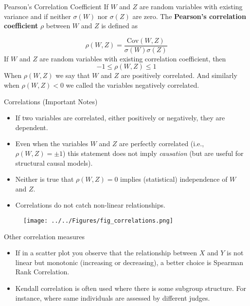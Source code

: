 \documentclass{beamer}
\begin{document}
\begin{frame}{Pearson's Correlation Coefficient}
If $W$ and $Z$ are random variables with existing variance and if neither $\sigma(W)$ nor $\sigma(Z)$ are zero. The {\bf Pearson's correlation coefficient} $\rho$ between $W$ and $Z$ is defined as

\begin{equation*}
	\rho(W,Z)= \frac{\textrm{Cov}(W,Z)}{\sigma(W)\sigma(Z)}
\end{equation*}
If $W$ and $Z$ are random variables with existing correlation coefficient, then
\begin{equation*}
	-1 \le \rho(W,Z) \le 1
\end{equation*}
When $\rho(W,Z)$ we say that $W$ and $Z$ are positively correlated. And similarly when $\rho(W,Z) < 0$ we called the variables negatively correlated. 


%

\end{frame}

\begin{frame}{Correlations (Important Notes)}

\begin{itemize}
	\item 	If two variables are correlated, either positively or negatively, they are dependent.
	\item Even when the variables $W$ and $Z$ are perfectly correlated (i.e., $\rho(W,Z)= \pm 1$) this statement does not imply {\it causation} (but are useful for structural causal models). 
	\item Neither is true that $\rho(W,Z)=0$ implies (statistical) independence of $W$ and $Z$.
	\item Correlations do not catch non-linear relationships. 
\end{itemize}
\begin{figure}
\centering
\texttt{[image: ../../Figures/fig\_correlations.png]}
\end{figure}
\end{frame}

\begin{frame}{Other correlation measures}
	\begin{itemize}
		\item If in a scatter plot you observe that the relationship between $X$ and $Y$ is not linear but monotonic (increasing or decreasing), a better choice is Spearman Rank Correlation. 
		\item Kendall correlation is often used where there is some subgroup structure. For instance, where same individuals are assessed by different judges.
	\end{itemize}
\end{frame}
\end{document}
